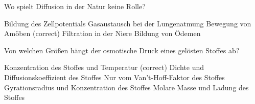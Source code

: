 \documentclass[11pt]{exam}
\begin{document}
\begin{questions}
\vspace{3mm}\question Wo spielt Diffusion in der Natur keine Rolle?

\begin{choices}
	\choice Bildung des Zellpotentials
	\choice Gasaustausch bei der Lungenatmung
	\choice Bewegung von Amöben (correct)
	\choice Filtration in der Niere
	\choice Bildung von Ödemen
\end{choices}

\vspace{3mm}\question Von welchen Größen hängt der osmotische Druck eines gelösten Stoffes ab?

\begin{choices}
	\choice Konzentration des Stoffes und Temperatur (correct)
	\choice Dichte und Diffusionskoeffizient des Stoffes
	\choice Nur vom Van't-Hoff-Faktor des Stoffes
	\choice Gyrationsradius und Konzentration des Stoffes
	\choice Molare Masse und Ladung des Stoffes
\end{choices}

\vspace{3mm}\end{questions}
\end{document}
